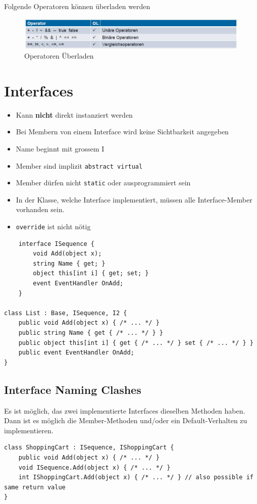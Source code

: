\documentclass[
a4paper,
oneside,
10pt,
fleqn,
headsepline,
toc=listofnumbered, 
bibliography=totocnumbered]{scrartcl}
\let\stdsection\section
\renewcommand\section{\clearpage\stdsection}
\begin{document}
Folgende Operatoren können überladen werden
\begin{figure}[!ht]
	\centering
	\includegraphics[width=0.7\linewidth]{images/operator_overloading}
	\caption{Operatoren Überladen}
	\label{fig:operatoroverloading}
\end{figure}


\section{Interfaces}
\begin{itemize}
	\item Kann \textbf{nicht} direkt instanziert werden
	\item Bei Membern von einem Interface wird keine Sichtbarkeit angegeben
	\item Name beginnt mit grossem I
	\item Member sind implizit \lstinline[language=C]|abstract virtual|
	\item Member dürfen nicht \lstinline|static| oder ausprogrammiert sein
	\item In der Klasse, welche Interface implementiert, müssen alle Interface-Member vorhanden sein.
	\item \lstinline|override| ist nicht nötig
\end{itemize}
\begin{lstlisting}
	interface ISequence {
		void Add(object x);
		string Name { get; }
		object this[int i] { get; set; }
		event EventHandler OnAdd;
	}
	
class List : Base, ISequence, I2 {
	public void Add(object x) { /* ... */ }
	public string Name { get { /* ... */ } }
    public object this[int i] { get { /* ... */ } set { /* ... */ } }
    public event EventHandler OnAdd;
} 
\end{lstlisting}

\subsection{Interface Naming Clashes}
Es ist möglich, das zwei implementierte Interfaces dieselben Methoden haben. Dann ist es möglich die Member-Methoden und/oder ein Default-Verhalten zu implementieren.

\begin{lstlisting}
class ShoppingCart : ISequence, IShoppingCart {
    public void Add(object x) { /* ... */ } 
    void ISequence.Add(object x) { /* ... */ } 
    int IShoppingCart.Add(object x) { /* ... */ } // also possible if same return value 
}
\end{lstlisting}
\end{document}
